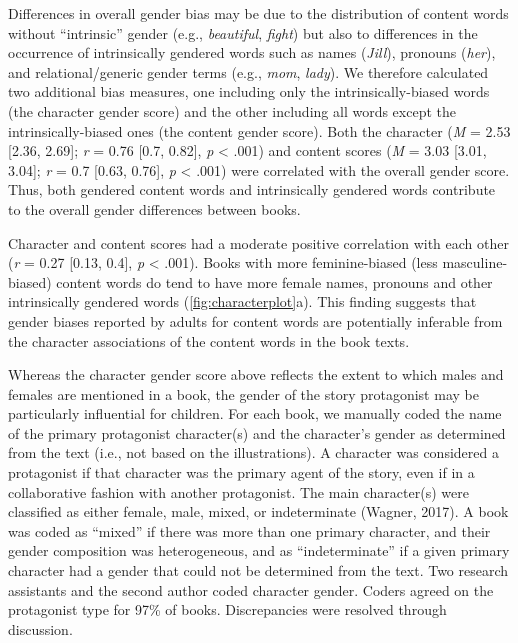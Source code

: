 \documentclass[
  english,
  ,man,floatsintext]{apa6}
\begin{document}
Differences in overall gender bias may be due to the distribution of content words without \enquote{intrinsic} gender (e.g., \emph{beautiful}, \emph{fight}) but also to differences in the occurrence of intrinsically gendered words such as names (\emph{Jill}), pronouns (\emph{her}), and relational/generic gender terms (e.g., \emph{mom}, \emph{lady}). We therefore calculated two additional bias measures, one including only the intrinsically-biased words (the character gender score) and the other including all words except the intrinsically-biased ones (the content gender score). Both the character (\emph{M} = 2.53 {[}2.36, 2.69{]}; \emph{r} = 0.76 {[}0.7, 0.82{]}, \emph{p} \textless{} .001) and content scores (\emph{M} = 3.03 {[}3.01, 3.04{]}; \emph{r} = 0.7 {[}0.63, 0.76{]}, \emph{p} \textless{} .001) were correlated with the overall gender score. Thus, both gendered content words and intrinsically gendered words contribute to the overall gender differences between books.

Character and content scores had a moderate positive correlation with each other (\emph{r} = 0.27 {[}0.13, 0.4{]}, \emph{p} \textless{} .001). Books with more feminine-biased (less masculine-biased) content words do tend to have more female names, pronouns and other intrinsically gendered words (\autoref{fig:characterplot}a). This finding suggests that gender biases reported by adults for content words are potentially inferable from the character associations of the content words in the book texts.

Whereas the character gender score above reflects the extent to which males and females are mentioned in a book, the gender of the story protagonist may be particularly influential for children. For each book, we manually coded the name of the primary protagonist character(s) and the character's gender as determined from the text (i.e., not based on the illustrations). A character was considered a protagonist if that character was the primary agent of the story, even if in a collaborative fashion with another protagonist. The main character(s) were classified as either female, male, mixed, or indeterminate (Wagner, 2017). A book was coded as \enquote{mixed} if there was more than one primary character, and their gender composition was heterogeneous, and as \enquote{indeterminate} if a given primary character had a gender that could not be determined from the text. Two research assistants and the second author coded character gender. Coders agreed on the protagonist type for 97\% of books. Discrepancies were resolved through discussion.
\end{document}

